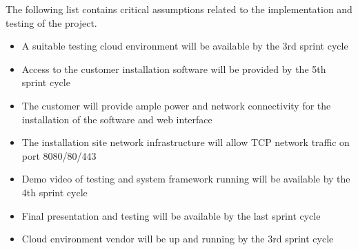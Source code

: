 The following list contains critical assumptions related to the implementation and testing of the project.

\begin{itemize}
  \item A suitable testing cloud environment will be available by the 3rd sprint cycle
  \item Access to the customer installation software will be provided by the 5th sprint cycle
  \item The customer will provide ample power and network connectivity for the installation of the software and web interface
  \item The installation site network infrastructure will allow TCP network traffic on port 8080/80/443
  \item Demo video of testing and system framework running will be available by the 4th sprint cycle
  \item Final presentation and testing will be available by the last sprint cycle
  \item Cloud environment vendor will be up and running by the 3rd sprint cycle
\end{itemize}
